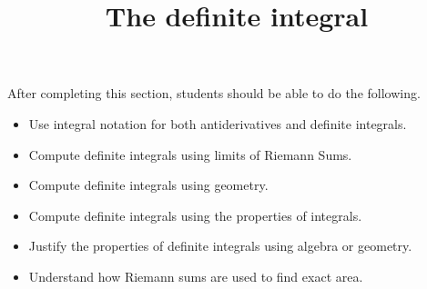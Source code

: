 \documentclass{ximera}
\title{The definite integral}
\begin{document}
\begin{abstract}
\end{abstract}

\maketitle

\begin{sectionOutcomes}

After completing this section, students should be able to do the following.

\begin{itemize}
	\item Use integral notation for both antiderivatives and definite integrals.
	\item Compute definite integrals using limits of Riemann Sums.
	\item Compute definite integrals using geometry.
	\item Compute definite integrals using the properties of integrals.
	\item Justify the properties of definite integrals using algebra or geometry.
	\item Understand how Riemann sums are used to find exact area.
\end{itemize}

\end{sectionOutcomes}
\end{document}
